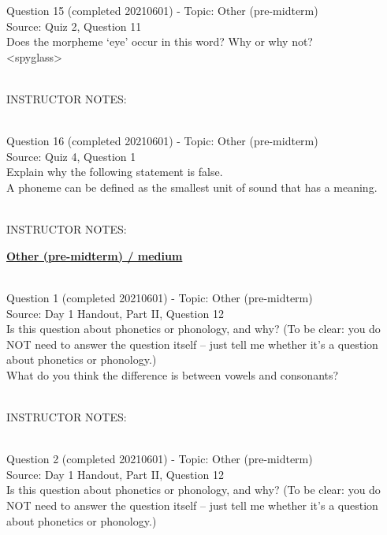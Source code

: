 \documentclass[12pt]{article}
\begin{document}
{\large Question 15} (completed 20210601) - Topic: Other (pre-midterm)\\
Source: Quiz 2, Question 11\\

Does the morpheme ‘eye’ occur in this word? Why or why not?\\

<spyglass>


~\\
INSTRUCTOR NOTES: 


~\\

{\large Question 16} (completed 20210601) - Topic: Other (pre-midterm)\\
Source: Quiz 4, Question 1\\

Explain why the following statement is false.\\

A phoneme can be defined as the smallest unit of sound that has a meaning.


~\\
INSTRUCTOR NOTES: 


\newpage\textbf{\underline{\huge Other (pre-midterm) / medium\\}}

~\\

{\large Question 1} (completed 20210601) - Topic: Other (pre-midterm)\\
Source: Day 1 Handout, Part II, Question 12\\

Is this question about phonetics or phonology, and why? (To be clear: you do NOT need to answer the question itself -- just tell me whether it's a question about phonetics or phonology.)\\

What do you think the difference is between vowels and consonants?


~\\
INSTRUCTOR NOTES: 


~\\

{\large Question 2} (completed 20210601) - Topic: Other (pre-midterm)\\
Source: Day 1 Handout, Part II, Question 12\\

Is this question about phonetics or phonology, and why? (To be clear: you do NOT need to answer the question itself -- just tell me whether it's a question about phonetics or phonology.)\\
\end{document}
